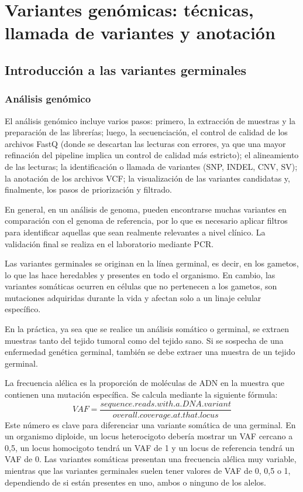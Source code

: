 \part{Variantes genómicas: técnicas, llamada de variantes y anotación}
\chapter{Introducción a las variantes germinales}
\section{Análisis genómico}
El análisis genómico incluye varios pasos: primero, la extracción de muestras y la preparación de las librerías; luego, la secuenciación, el control de calidad de los archivos FastQ (donde se descartan las lecturas con errores, ya que una mayor refinación del pipeline implica un control de calidad más estricto); el alineamiento de las lecturas; la identificación o llamada de variantes (SNP, INDEL, CNV, SV); la anotación de los archivos VCF; la visualización de las variantes candidatas y, finalmente, los pasos de priorización y filtrado.

En general, en un análisis de genoma, pueden encontrarse muchas variantes en comparación con el genoma de referencia, por lo que es necesario aplicar filtros para identificar aquellas que sean realmente relevantes a nivel clínico. La validación final se realiza en el laboratorio mediante PCR.

Las variantes germinales se originan en la línea germinal, es decir, en los gametos, lo que las hace heredables y presentes en todo el organismo. En cambio, las variantes somáticas ocurren en células que no pertenecen a los gametos, son mutaciones adquiridas durante la vida y afectan solo a un linaje celular específico.

En la práctica, ya sea que se realice un análisis somático o germinal, se extraen muestras tanto del tejido tumoral como del tejido sano. Si se sospecha de una enfermedad genética germinal, también se debe extraer una muestra de un tejido germinal.

La frecuencia alélica es la proporción de moléculas de ADN en la muestra que contienen una mutación específica. Se calcula mediante la siguiente fórmula:
$$VAF = \frac{sequence.reads.with.a.DNA.variant}{overall.coverage.at.that.locus}$$
Este número es clave para diferenciar una variante somática de una germinal. En un organismo diploide, un locus heterocigoto debería mostrar un VAF cercano a 0,5, un locus homocigoto tendrá un VAF de 1 y un locus de referencia tendrá un VAF de 0. Las variantes somáticas presentan una frecuencia alélica muy variable, mientras que las variantes germinales suelen tener valores de VAF de 0, 0,5 o 1, dependiendo de si están presentes en uno, ambos o ninguno de los alelos.

